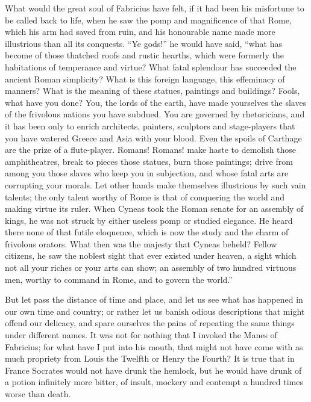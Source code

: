 What would the great soul of Fabricius have felt, if it had been his
misfortune to be called back to life, when he saw the pomp and
magnificence of that Rome, which his arm had saved from ruin, and his
honourable name made more illustrious than all its conquests. ``Ye
gods!'' he would have said, ``what has become of those thatched roofs
and rustic hearths, which were formerly the habitations of temperance
and virtue? What fatal splendour has succeeded the ancient Roman
simplicity? What is this foreign language, this effeminacy of manners?
What is the meaning of these statues, paintings and buildings? Fools,
what have you done? You, the lords of the earth, have made yourselves
the slaves of the frivolous nations you have subdued. You are governed
by rhetoricians, and it has been only to enrich architects, painters,
sculptors and stage-players that you have watered Greece and Asia with
your blood. Even the spoils of Carthage are the prize of a
flute-player. Romans! Romans! make haste to demolish those
amphitheatres, break to pieces those  statues, burn those
paintings; drive from among you those slaves who keep you in
subjection, and whose fatal arts are corrupting your morals. Let other
hands make themselves illustrious by such vain talents; the only
talent worthy of Rome is that of conquering the world and making
virtue its ruler. When Cyneas took the Roman senate for an assembly of
kings, he was not struck by either useless pomp or studied elegance.
He heard there none of that futile eloquence, which is now the study
and the charm of frivolous orators. What then was the majesty that
Cyneas beheld? Fellow citizens, he saw the noblest sight that ever
existed under heaven, a sight which not all your riches or your arts
can show; an assembly of two hundred virtuous men, worthy to command
in Rome, and to govern the world.''

But let pass the distance of time and place, and let us see what has
happened in our own time and country; or rather let us banish odious
descriptions that might offend our delicacy, and spare ourselves the
pains of repeating the same things under different names. It was not
for nothing that I invoked the Manes of Fabricius; for what have I put
into his mouth, that might not have come with as much propriety from
Louis the Twelfth or Henry the Fourth? It is true that in France
Socrates would not have drunk the hemlock, but he would have drunk of
a potion infinitely more bitter, of insult, mockery and contempt a
hundred times worse than death.

